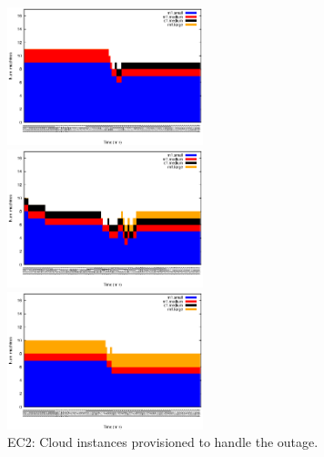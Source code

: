 \begin{figure}[htb]
	\begin{minipage}[b]{0.32\linewidth}
		\vspace{-4mm}
		\includegraphics[height=4cm]{images/exps2011/low/ec2/inst_type_machines_filtered.eps}	
		\vspace{-4mm}
	\end{minipage}
	\hfill
	\begin{minipage}[b]{0.32\linewidth}
		\vspace{-4mm}
		\includegraphics[height=4cm]{images/exps2011/medium/ec2/inst_type_machines_filtered.eps}
		\vspace{-4mm}
	\end{minipage}
\hfill
\begin{minipage}[b]{0.32\linewidth}
		\vspace{-4mm}
		\includegraphics[height=4cm]{images/exps2011/high/ec2/inst_type_machines_filtered.eps}
		\vspace{-4mm}
	\end{minipage}
\caption{EC2: Cloud instances provisioned to handle the outage.}
\label{fig:EC2Instances}
\end{figure}

